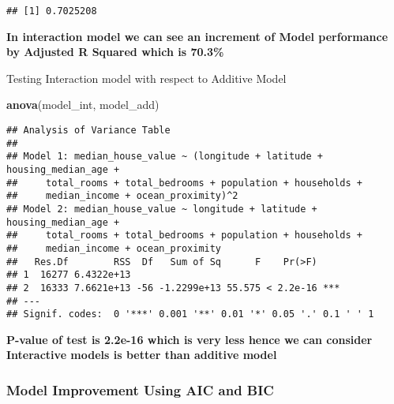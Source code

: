 \documentclass[
]{article}
\newenvironment{Shaded}{\begin{snugshade}}{\end{snugshade}}
\newcommand{\DataTypeTok}[1]{\textcolor[rgb]{0.13,0.29,0.53}{#1}}
\newcommand{\DecValTok}[1]{\textcolor[rgb]{0.00,0.00,0.81}{#1}}
\newcommand{\KeywordTok}[1]{\textcolor[rgb]{0.13,0.29,0.53}{\textbf{#1}}}
\newcommand{\NormalTok}[1]{#1}
\newcommand{\OperatorTok}[1]{\textcolor[rgb]{0.81,0.36,0.00}{\textbf{#1}}}
\newcommand{\StringTok}[1]{\textcolor[rgb]{0.31,0.60,0.02}{#1}}
\begin{document}
\begin{verbatim}
## [1] 0.7025208
\end{verbatim}

\textbf{In interaction model we can see an increment of Model
performance by Adjusted R Squared which is 70.3\%}

{ Testing Interaction model with respect to Additive Model}

\begin{Shaded}
\begin{Highlighting}[]
\KeywordTok{anova}\NormalTok{(model_int, model_add)}
\end{Highlighting}
\end{Shaded}

\begin{verbatim}
## Analysis of Variance Table
## 
## Model 1: median_house_value ~ (longitude + latitude + housing_median_age + 
##     total_rooms + total_bedrooms + population + households + 
##     median_income + ocean_proximity)^2
## Model 2: median_house_value ~ longitude + latitude + housing_median_age + 
##     total_rooms + total_bedrooms + population + households + 
##     median_income + ocean_proximity
##   Res.Df        RSS  Df   Sum of Sq      F    Pr(>F)    
## 1  16277 6.4322e+13                                     
## 2  16333 7.6621e+13 -56 -1.2299e+13 55.575 < 2.2e-16 ***
## ---
## Signif. codes:  0 '***' 0.001 '**' 0.01 '*' 0.05 '.' 0.1 ' ' 1
\end{verbatim}

\textbf{P-value of test is 2.2e-16 which is very less hence we can
consider Interactive models is better than additive model}

\hypertarget{model-improvement-using-aic-and-bic}{%
\subsubsection{Model Improvement Using AIC and
BIC}\label{model-improvement-using-aic-and-bic}}

\begin{Shaded}
\end{Shaded}
\end{document}
